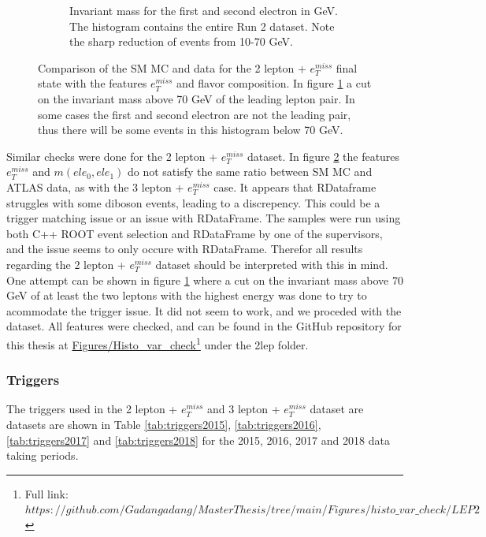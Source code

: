 \begin{figure}[H]
\begin{subfigure}{.6\textwidth}
        \caption{Invariant mass for the first and second electron in GeV. The histogram contains the entire Run 2 dataset. Note the sharp reduction of events from 10-70 GeV.}
        \label{fig:mll_2lep}
    \end{subfigure}
    \hfill        
    \caption[2 lepton + $e_T^{miss}$ Monte Carlo and ATLAS data comparison]{Comparison of the SM MC and data for the 2 lepton + $e_T^{miss}$ final 
    state with the features $e_{T}^{miss}$ and flavor composition. In figure \ref{fig:mll_2lep} a cut on the invariant mass above 70 GeV of the leading lepton
    pair. In some cases the first and second electron are not the leading pair, thus there will be some events in this histogram below 70 GeV. 
    }
    \label{fig:MC_Data_comp_2lep}
\end{figure}

Similar checks were done for the 2 lepton + $e_T^{miss}$ dataset. In figure \ref{fig:MC_Data_comp_2lep} the features $e_T^{miss}$ and $m(ele_0, ele_1)$ 
do not satisfy the same ratio between SM MC and ATLAS data, as with the 3 lepton + $e_T^{miss}$ case. It appears that RDataframe struggles with some diboson events, 
leading to a discrepency. This could be a trigger matching issue or an issue with RDataFrame. The samples were run using both C++ ROOT event selection and RDataFrame by one of the supervisors, and the 
issue seems to only occure with RDataFrame. Therefor all results regarding the 2 lepton + $e_T^{miss}$ dataset should be interpreted with this in mind. One attempt can be shown in 
figure \ref{fig:mll_2lep} where a cut on the invariant mass above 70 GeV of at least the two leptons with the highest energy was done to try to acommodate the trigger issue. 
It did not seem to work, and we proceded with the dataset. All features were checked, and can be found in the GitHub repository for this thesis at 
\href{https://github.com/Gadangadang/MasterThesis/tree/main}{Figures/Histo\_var\_check}\footnote{Full link: \href{https://github.com/Gadangadang/MasterThesis/tree/main/Figures/histo_var_check/LEP2}{$https://github.com/Gadangadang/MasterThesis/tree/main/Figures/histo\_var\_check/LEP2$}} under the 2lep folder.



\subsubsection*{Triggers }\label{sec:triggers}

The triggers used in the 2 lepton + $e_T^{miss}$  and 3 lepton + $e_T^{miss}$ dataset are datasets are shown in Table 
\ref{tab:triggers2015}, \ref{tab:triggers2016}, \ref{tab:triggers2017} and \ref{tab:triggers2018} for the 2015, 2016, 2017 and 2018 data taking periods.


